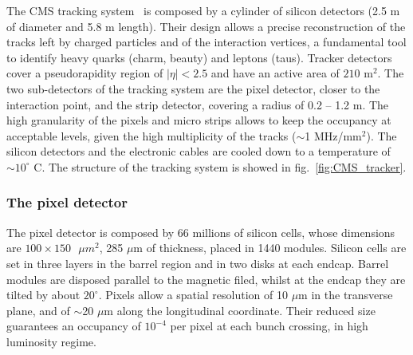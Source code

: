 The CMS tracking system~\cite{Karimäki:368412,Chatrchyan:2014fea} is composed by a cylinder of silicon detectors (2.5 m of diameter and 5.8 m length). Their design allows a precise reconstruction of the tracks left by charged particles and of the interaction vertices, a fundamental tool to identify heavy quarks (charm, beauty) and leptons (taus).
Tracker detectors cover a pseudorapidity region of $|\eta|<2.5$ and have an active area of $210\text{ m}^2$. The two sub-detectors of the tracking system are the pixel detector, closer to the interaction point, and the strip detector, covering a radius of 0.2 -- 1.2 m. The high granularity of the pixels and micro strips allows to keep the occupancy at acceptable levels, given the high multiplicity of the tracks ($\sim$1 MHz/$\text{mm}^2$). The silicon detectors and the electronic cables are cooled down to a temperature of $\sim 10^{\circ}$ C. The structure of the tracking system is showed in fig.~\ref{fig:CMS_tracker}.

\subsubsection{The pixel detector}
The pixel detector is composed by 66 millions of silicon cells, whose dimensions are $100 \times 150 \text{ }{\mu{m}}^2$, 285 $\mu$m of thickness, placed in 1440 modules. Silicon cells are set in three layers in the barrel region and in two disks at each endcap. Barrel modules are disposed parallel to the magnetic filed, whilst at the endcap they are tilted by about $20^{\circ}$. 
Pixels allow a spatial resolution of 10 $\mu$m in the transverse plane, and of $\sim$20 $\mu$m along the longitudinal coordinate. Their reduced size guarantees an occupancy of $10^{-4}$ per pixel at each bunch crossing, in high luminosity regime.

